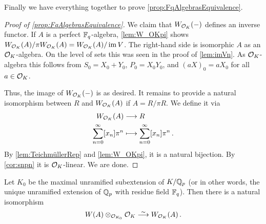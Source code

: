 \documentclass[a4paper, 10pt, oneside, DIV=9, chapterprefix=true, numbers=enddot,bibliography=totoc]{scrbook}
\begin{document}
Finally we have everything together to prove \cref{prop:FqAlgebrasEquivalence}.
\begin{proof}[Proof of \cref{prop:FqAlgebrasEquivalence}]
	We claim that $W_{\mathcal{O}_K}(-)$ defines an inverse functor. If $A$ is a perfect $\mathbb{F}_q$-algebra, \cref{lem:W_OKpi} shows $W_{\mathcal{O}_K}(A)/\pi W_{\mathcal{O}_K}(A)= W_{\mathcal{O}_K}(A)/\operatorname{im} V$. The right-hand side is isomorphic $A$ as an $\mathcal{O}_K$-algebra. On the level of sets this was seen in the proof of \cref{lem:imVn}. As $\mathcal{O}_K$-algebra this follows from $S_0=X_0+Y_0$, $P_0=X_0Y_0$, and $(aX)_0=aX_0$ for all $a\in\mathcal{O}_K$.
	
	Thus, the image of $W_{\mathcal{O}_K}(-)$ is as desired. It remains to provide a natural isomorphism between $R$ and $W_{\mathcal{O}_K}(A)$ if $A=R/\pi R$. We define it via
	\begin{align*}
		W_{\Oo_K}(A)&\morphism R\\
		\sum_{n=0}^\infty[x_n]\pi^n&\longmapsto\sum_{n=0}^\infty[x_n]\pi^n\,.
	\end{align*}
	By \cref{lem:TeichmüllerRep} and \cref{lem:W_OKpi}, it is a natural bijection. By \cref{cor:snpn} it is $\mathcal{O}_K$-linear. We are done.
\end{proof}
\begin{cor}\label{cor:unramifiedWitt}
	Let $K_0$ be the maximal unramified subextension of $K/\mathbb{Q}_p$ (or in other words, the unique unramified extension of $\mathbb{Q}_p$ with residue field $\mathbb{F}_q$). Then there is a natural isomorphism
	\begin{equation*}
		W(A)\otimes_{\Oo_{K_0}}\Oo_K\isomorphism W_{\Oo_K}(A)\,.
	\end{equation*}
\end{cor}
\end{document}
